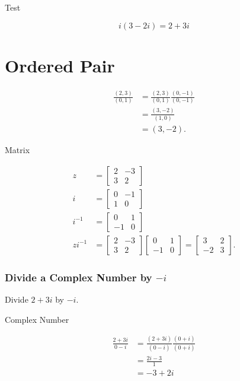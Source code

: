 Test

$$
i(3-2 i)=2+3 i
$$

\section{Ordered Pair}
$$
\begin{aligned}
\frac{(2,3)}{(0,1)} & =\frac{(2,3)}{(0,1)} \frac{(0,-1)}{(0,-1)} \\
& =\frac{(3,-2)}{(1,0)} \\
& =(3,-2) .
\end{aligned}
$$

Matrix

$$
\begin{aligned}
z & =\left[\begin{array}{cc}
2 & -3 \\
3 & 2
\end{array}\right] \\
i & =\left[\begin{array}{cc}
0 & -1 \\
1 & 0
\end{array}\right] \\
i^{-1} & =\left[\begin{array}{cc}
0 & 1 \\
-1 & 0
\end{array}\right] \\
z i^{-1} & =\left[\begin{array}{ll}
2 & -3 \\
3 & 2
\end{array}\right]\left[\begin{array}{cc}
0 & 1 \\
-1 & 0
\end{array}\right]=\left[\begin{array}{cc}
3 & 2 \\
-2 & 3
\end{array}\right] .
\end{aligned}
$$

\subsubsection{Divide a Complex Number by $-i$}
Divide $2+3 i$ by $-i$.

Complex Number

$$
\begin{aligned}
\frac{2+3 i}{0-i} & =\frac{(2+3 i)}{(0-i)} \frac{(0+i)}{(0+i)} \\
& =\frac{2 i-3}{1} \\
& =-3+2 i
\end{aligned}
$$

